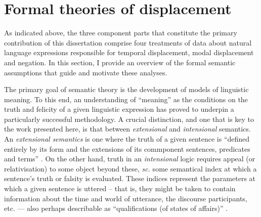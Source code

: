\documentclass[12pt,dvipsnames]{report}
\begin{document}
%			
\section{Formal theories of displacement}\label{LitRev}






As indicated above, the three component parts that constitute the primary contribution of this dissertation comprise four treatments of data about natural language expressions responsible for temporal displacement, modal displacement and negation. In this section, I provide an overview of the formal semantic assumptions that guide and motivate these analyses.


The primary goal of semantic theory is the development of models of linguistic meaning. To this end, an understanding of ``meaning'' as the conditions on the truth and felicity of a given linguistic expression has proved to underpin a particularly successful methodology. A crucial distinction, and one that is key to the work presented here, is that between \textit{extensional} and \textit{intensional} semantics. An \textit{extensional semantics} is one where the truth of a given sentence is ``defined entirely by its form and the extensions of its commponent sentences, predicates and terms'' \citep{Menzel2017}. On the other hand, truth in an \textit{intensional} logic requires appeal (or relativisation) to some object beyond these, \textit{sc.} some semantical index at which a sentence's truth or falsity is evaluated. These indices represent the parameters at which a given sentence is uttered -- that is, they might be taken to contain information about the time and world of utterance, the discourse participants, etc. --- also perhaps describable as ``qualifications (of states of affairs)'' \citep{Nuyts2005}.
\end{document}
